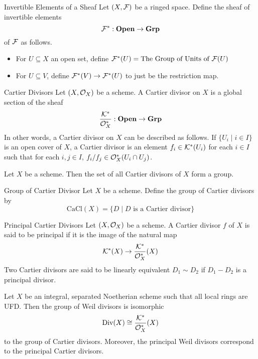 \documentclass[a4paper]{article}
\begin{document}
\begin{defn}{Invertible Elements of a Sheaf}{} Let $(X,\mathcal{F})$ be a ringed space. Define the sheaf of invertible elements $$\mathcal{F}^\ast:\bold{Open}\to\bold{Grp}$$ of $\mathcal{F}$ as follows. 
\begin{itemize}
\item For $U\subseteq X$ an open set, define $\mathcal{F}^\ast(U)=\text{The Group of Units of }\mathcal{F}(U)$
\item For $U\subseteq V$, define $\mathcal{F}^\ast(V)\to\mathcal{F}^\ast(U)$ to just be the restriction map. 
\end{itemize}
\end{defn}

\begin{defn}{Cartier Divisors}{} Let $(X,\mathcal{O}_X)$ be a scheme. A Cartier divisor on $X$ is a global section of the sheaf $$\frac{\mathcal{K}^\ast}{\mathcal{O}_X^\ast}:\bold{Open}\to\bold{Grp}$$ In other words, a Cartier divisor on $X$ can be described as follows. If $\{U_i\;|\;i\in I\}$ is an open cover of $X$, a Cartier divisor is an element $f_i\in\mathcal{K}^\ast(U_i)$ for each $i\in I$ such that for each $i,j\in I$, $f_i/f_j\in\mathcal{O}_X^\ast(U_i\cap U_j)$. 
\end{defn}

\begin{lmm}{}{} Let $X$ be a scheme. Then the set of all Cartier divisors of $X$ form a group. 
\end{lmm}

\begin{defn}{Group of Cartier Divisor}{} Let $X$ be a scheme. Define the group of Cartier divisors by $$\text{CaCl}(X)=\{D\;|\;D\text{ is a Cartier divisor}\}$$
\end{defn}

\begin{defn}{Principal Cartier Divisors}{} Let $(X,\mathcal{O}_X)$ be a scheme. A Cartier divisor $f$ of $X$ is said to be principal if it is the image of the natural map $$\mathcal{K}^\ast(X)\to\frac{\mathcal{K}^\ast}{\mathcal{O}_X^\ast}(X)$$ Two Cartier divisors are said to be linearly equivalent $D_1\sim D_2$ if $D_1-D_2$ is a principal divisor. 
\end{defn}

\begin{prp}{}{} Let $X$ be an integral, separated Noetherian scheme such that all local rings are UFD. Then the group of Weil divisors is isomorphic $$\text{Div}(X)\cong\frac{\mathcal{K}^\ast}{\mathcal{O}_X^\ast}(X)$$ to the group of Cartier divisors. Moreover, the principal Weil divisors correspond to the principal Cartier divisors. 
\end{prp}
\end{document}
